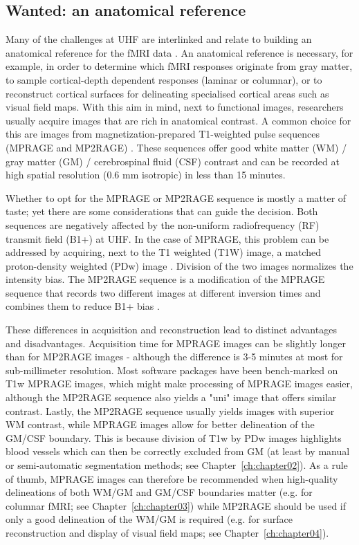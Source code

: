 \subsection{Wanted: an anatomical reference}
Many of the challenges at UHF are interlinked and relate to building an anatomical reference for the fMRI data \parencite{Polimeni2017}. An anatomical reference is necessary, for example, in order to determine which fMRI responses originate from gray matter, to sample cortical-depth dependent responses (laminar or columnar), or to reconstruct cortical surfaces for delineating specialised cortical areas such as visual field maps. With this aim in mind, next to functional images, researchers usually acquire images that are rich in anatomical contrast. A common choice for this are images from magnetization-prepared T1-weighted pulse sequences (MPRAGE and MP2RAGE) \parencite{Mugler1990, Moortele2009, Marques2010}. These sequences offer good white matter (WM) / gray matter (GM) / cerebrospinal fluid (CSF) contrast and can be recorded at high spatial resolution (0.6 mm isotropic) in less than 15 minutes.

Whether to opt for the MPRAGE or MP2RAGE sequence is mostly a matter of taste; yet there are some considerations that can guide the decision. Both sequences are negatively affected by the non-uniform radiofrequency (RF) transmit field (B1+) at UHF. In the case of MPRAGE, this problem can be addressed by acquiring, next to the T1 weighted (T1W) image, a matched proton-density weighted (PDw) image \parencite{Moortele2009}. Division of the two images normalizes the intensity bias. The MP2RAGE sequence is a modification of the MPRAGE sequence that records two different images at different inversion times and combines them to reduce B1+ bias \parencite{Marques2010}.

These differences in acquisition and reconstruction lead to distinct advantages and disadvantages. Acquisition time for MPRAGE images can be slightly longer than for MP2RAGE images - although the difference is 3-5 minutes at most for sub-millimeter resolution. Most software packages have been bench-marked on T1w MPRAGE images, which might make processing of MPRAGE images easier, although the MP2RAGE sequence also yields a "uni" image that offers similar contrast. Lastly, the MP2RAGE sequence usually yields images with superior WM contrast, while MPRAGE images allow for better delineation of the GM/CSF boundary. This is because division of T1w by PDw images highlights blood vessels \parencite{Moortele2009} which can then be correctly excluded from GM (at least by manual or semi-automatic segmentation methods; see Chapter~\ref{ch:chapter02}). As a rule of thumb, MPRAGE images can therefore be recommended when high-quality delineations of both WM/GM and GM/CSF boundaries matter (e.g. for columnar fMRI; see Chapter~\ref{ch:chapter03}) while MP2RAGE should be used if only a good delineation of the WM/GM is required (e.g. for surface reconstruction and display of visual field maps; see Chapter~\ref{ch:chapter04}).


